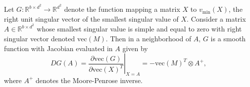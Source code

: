 \documentclass{biometrika}
\begin{document}
\begin{lemma} \label{lem::JacobianOfSingularVector}
    Let $G: \mathbb{R}^{b \times d^2} \rightarrow \mathbb{R}^{d^2}$ denote the function mapping a matrix $X$ to $v_{\min}(X)$, the right unit singular vector of the smallest singular value of $X$. Consider a matrix $A \in \mathbb{R}^{b \times d^2}$ whose smallest singular value is simple and equal to zero with right singular vector denoted $\mathrm{vec}(M)$. Then in a neighborhood of $A$, $G$ is a smooth function with Jacobian evaluated in $A$ given by 
    \begin{equation}
        DG(A) = \left. \frac{\partial \mathrm{vec}(G)}{\partial \mathrm{vec}(X)^T} \right |_{X = A}  = - \mathrm{vec}(M)^T \otimes A^{+},
    \end{equation}
    where $A^{+}$ denotes the Moore-Penrose inverse. 
\end{lemma}
\end{document}
